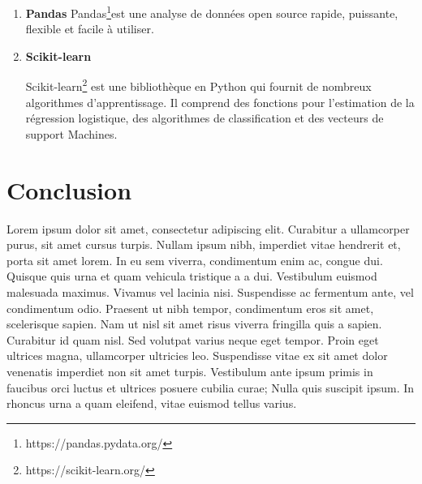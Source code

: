 \begin{enumerate}
\item \textbf{Pandas}
Pandas\footnote{https://pandas.pydata.org/}est une analyse de données open source rapide, puissante, flexible et facile à utiliser.

\item \textbf{Scikit-learn}

Scikit-learn\footnote{https://scikit-learn.org/} est une bibliothèque en Python qui fournit de nombreux algorithmes d'apprentissage. Il comprend des fonctions pour l'estimation de la régression logistique, des algorithmes de classification et des vecteurs de support Machines.
\end{enumerate}



\section{Conclusion}
Lorem ipsum dolor sit amet, consectetur adipiscing elit. Curabitur a ullamcorper purus, sit amet cursus turpis. Nullam ipsum nibh, imperdiet vitae hendrerit et, porta sit amet lorem. In eu sem viverra, condimentum enim ac, congue dui. Quisque quis urna et quam vehicula tristique a a dui. Vestibulum euismod malesuada maximus. Vivamus vel lacinia nisi. Suspendisse ac fermentum ante, vel condimentum odio. Praesent ut nibh tempor, condimentum eros sit amet, scelerisque sapien. Nam ut nisl sit amet risus viverra fringilla quis a sapien. Curabitur id quam nisl. Sed volutpat varius neque eget tempor. Proin eget ultrices magna, ullamcorper ultricies leo. Suspendisse vitae ex sit amet dolor venenatis imperdiet non sit amet turpis. Vestibulum ante ipsum primis in faucibus orci luctus et ultrices posuere cubilia curae; Nulla quis suscipit ipsum. In rhoncus urna a quam eleifend, vitae euismod tellus varius.


